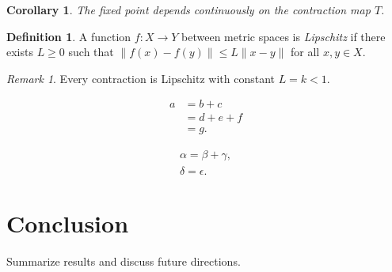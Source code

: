 \documentclass[11pt]{amsart}
\numberwithin{equation}{section}
\theoremstyle{plain}
\newtheorem{cor}[thm]{Corollary}
\theoremstyle{definition}
\newtheorem{defn}[thm]{Definition}
\theoremstyle{remark}
\newtheorem{rem}[thm]{Remark}
\newcommand{\norm}[1]{\lVert #1 \rVert}
\begin{document}
\begin{cor}
  \label{cor:apply}
  The fixed point depends continuously on the contraction map $T$.
\end{cor}

\begin{defn}
  \label{defn:lipschitz}
  A function $f \colon X \to Y$ between metric spaces is \emph{Lipschitz}
  if there exists $L \ge 0$ such that $\norm{f(x) - f(y)} \le L \norm{x - y}$
  for all $x, y \in X$.
\end{defn}

\begin{rem}
  Every contraction is Lipschitz with constant $L = k < 1$.
\end{rem}

\begin{equation}
  \label{eq:multiline}
  \begin{split}
    a &= b + c \\
      &= d + e + f \\
      &= g.
  \end{split}
\end{equation}

\begin{gather}
  \label{eq:gather1}
  \alpha = \beta + \gamma, \\
  \label{eq:gather2}
  \delta = \epsilon.
\end{gather}

\section{Conclusion}
\label{sec:conclusion}

Summarize results and discuss future directions.

% 
% 

\end{document}

